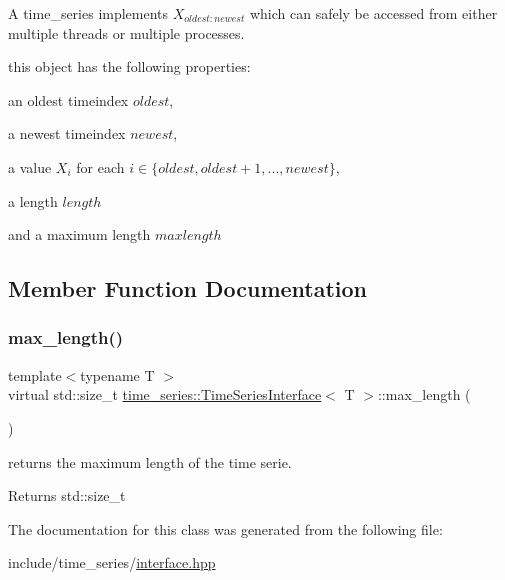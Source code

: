 A time\+\_\+series implements $ X_{{oldest}:{newest}} $ which can safely be accessed from either multiple threads or multiple processes.

this object has the following properties\+:
\begin{DoxyItemize}
\item an oldest timeindex $ oldest$,
\item a newest timeindex $ newest $,
\item a value $ X_i $ for each $ i \in \{oldest, oldest + 1 , ..., newest\} $,
\item a length $length$
\item and a maximum length $maxlength$ 
\end{DoxyItemize}

\subsection{Member Function Documentation}
\mbox{\label{classtime__series_1_1TimeSeriesInterface_aded8927e82c060aa3367f17dfd59a8ec}} 
\subsubsection{\texorpdfstring{max\+\_\+length()}{max\_length()}}
{\footnotesize\ttfamily template$<$typename T $>$ \\
virtual std\+::size\+\_\+t \hyperlink{classtime__series_1_1TimeSeriesInterface}{time\+\_\+series\+::\+Time\+Series\+Interface}$<$ T $>$\+::max\+\_\+length (\begin{DoxyParamCaption}{ }\end{DoxyParamCaption})\hspace{0.3cm}{\ttfamily [pure virtual]}}



returns the maximum length of the time serie. 

\begin{DoxyReturn}{Returns}
std\+::size\+\_\+t 
\end{DoxyReturn}


The documentation for this class was generated from the following file\+:\begin{DoxyCompactItemize}
\item 
include/time\+\_\+series/\hyperlink{interface_8hpp}{interface.\+hpp}\end{DoxyCompactItemize}
